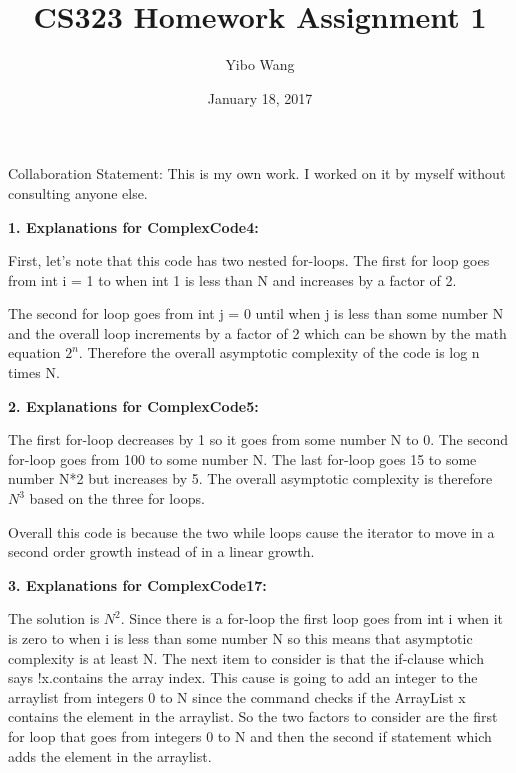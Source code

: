 \documentclass[11pt, oneside]{article}   	%
\title{CS323 Homework Assignment 1}
\author{Yibo Wang}
\date{January 18, 2017}							%
\begin{document}
\maketitle

Collaboration Statement: This is my own work. I worked on it by myself without consulting anyone else. 

\vspace{5mm}

\textbf{1. Explanations for ComplexCode4:}

First, let's note that this code has two nested for-loops. The first for loop goes from int i = 1 to when int 1 is less than N and increases by a factor of 2. 


\vspace{5mm}

The second for loop goes from int j = 0 until when j is less than some number N and the overall loop increments by a factor of 2 which can be shown by the math equation $2^{n}$. Therefore the overall asymptotic complexity of the code is log n times N. 

\vspace{5mm}

\textbf{2. Explanations for ComplexCode5:}

The first for-loop decreases by 1 so it goes from some number N to 0. The second for-loop goes from 100 to some number N. The last for-loop goes 15 to some number N*2 but increases by 5. The overall asymptotic complexity is therefore $N^{3}$ based on the three for loops. 

\vspace{5mm}

Overall this code is because the two while loops cause the iterator to move in a second order growth instead of in a linear growth. 
\vspace{5mm}

%
\textbf{3. Explanations for ComplexCode17:}

\vspace{5mm}

The solution is  $N^{2}$. Since there is a for-loop the first loop goes from int i when it is zero to when i is less than some number N so this means that asymptotic complexity is at least N.  The next item to consider is that the if-clause which says !x.contains the array index. This cause is going to add an integer to the arraylist from integers 0 to N since the command checks if the ArrayList x contains the element in the arraylist. So the two factors to consider are the first for loop that goes from integers 0 to N and then the second if statement which adds the element in the arraylist. 
\end{document}
